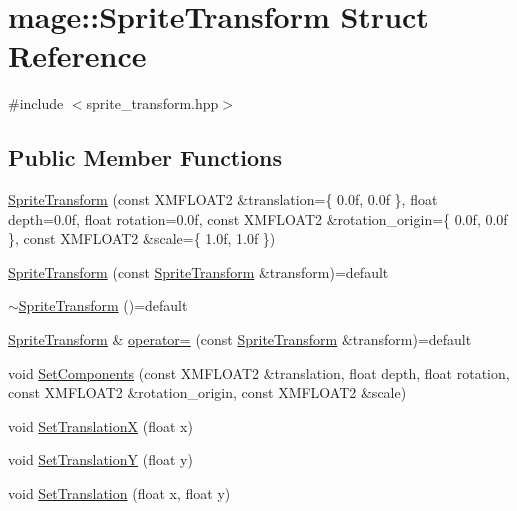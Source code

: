 \hypertarget{structmage_1_1_sprite_transform}{}\section{mage\+:\+:Sprite\+Transform Struct Reference}
\label{structmage_1_1_sprite_transform}


{\ttfamily \#include $<$sprite\+\_\+transform.\+hpp$>$}

\subsection*{Public Member Functions}
\begin{DoxyCompactItemize}
\item 
\hyperlink{structmage_1_1_sprite_transform_a60ab10912457ce7939c181fc67633fcf}{Sprite\+Transform} (const X\+M\+F\+L\+O\+A\+T2 \&translation=\{ 0.\+0f, 0.\+0f \}, float depth=0.\+0f, float rotation=0.\+0f, const X\+M\+F\+L\+O\+A\+T2 \&rotation\+\_\+origin=\{ 0.\+0f, 0.\+0f \}, const X\+M\+F\+L\+O\+A\+T2 \&scale=\{ 1.\+0f, 1.\+0f \})
\item 
\hyperlink{structmage_1_1_sprite_transform_a0126a3f6c7f486f10ec5d5ffd1180698}{Sprite\+Transform} (const \hyperlink{structmage_1_1_sprite_transform}{Sprite\+Transform} \&transform)=default
\item 
\hyperlink{structmage_1_1_sprite_transform_a14a3614023996cbb071c3de99f9528bc}{$\sim$\+Sprite\+Transform} ()=default
\item 
\hyperlink{structmage_1_1_sprite_transform}{Sprite\+Transform} \& \hyperlink{structmage_1_1_sprite_transform_af0adccff92d48e7b347e66277981ee07}{operator=} (const \hyperlink{structmage_1_1_sprite_transform}{Sprite\+Transform} \&transform)=default
\item 
void \hyperlink{structmage_1_1_sprite_transform_adcdc96cc280d571883e88a4791cca063}{Set\+Components} (const X\+M\+F\+L\+O\+A\+T2 \&translation, float depth, float rotation, const X\+M\+F\+L\+O\+A\+T2 \&rotation\+\_\+origin, const X\+M\+F\+L\+O\+A\+T2 \&scale)
\item 
void \hyperlink{structmage_1_1_sprite_transform_a59f5300f046b73c958084977158ed789}{Set\+TranslationX} (float x)
\item 
void \hyperlink{structmage_1_1_sprite_transform_a52a07a3c3d9f65a33bc658208cd40444}{Set\+TranslationY} (float y)
\item 
void \hyperlink{structmage_1_1_sprite_transform_aa8e838691b090b12ed275aeb61413d80}{Set\+Translation} (float x, float y)

\end{DoxyCompactItemize}
